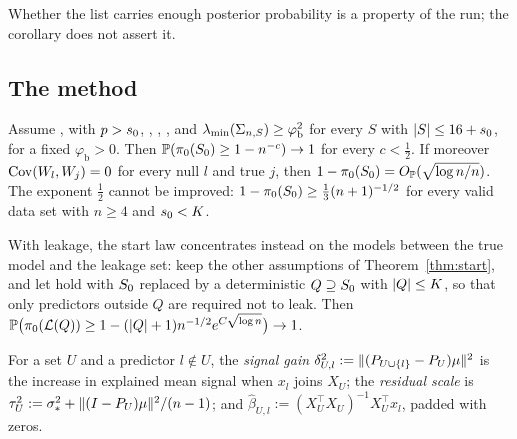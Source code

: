 Whether the list carries enough posterior probability is a property of the run; the corollary does not assert it.

\subsection{The method}\label{sec:supp-method}


\begin{theorem}\label{thm:start}
Assume ,  with $p>s_0$, , , , and $\lambda_{\min}(\Sigma_{n,S})\ge\varphi_{\mathrm b}^2$ for every
$S$ with $\lvert S\rvert\le16+s_0$, for a fixed $\varphi_{\mathrm b}>0$. Then $\mathbb{P}(\pi_0(S_0)\ge1-n^{-c})\to1$ for every
$c<\tfrac12$. If moreover $\operatorname{Cov}(W_l,W_j)=0$ for every null $l$ and true $j$, then $1-\pi_0(S_0)=O_{\mathbb{P}}(\sqrt{\log n/n})$. The exponent
$\tfrac12$ cannot be improved: $1-\pi_0(S_0)\ge\tfrac13(n+1)^{-1/2}$ for every valid data set with $n\ge4$ and $s_0<K$.
\end{theorem}


With leakage, the start law concentrates instead on the models between the true model and the leakage set: keep the
other assumptions of Theorem~\ref{thm:start}, and let  hold with $S_0$ replaced by a deterministic $Q\supseteq S_0$ with $\lvert Q\rvert\le K$, so
that only predictors outside $Q$ are required not to leak. Then $\mathbb{P}\big(\pi_0(\mathcal L(Q))\ge1-(\lvert Q\rvert+1)n^{-1/2}e^{C\sqrt{\log n}}\big)\to1$.


For a set $U$ and a predictor $l\notin U$, the \emph{signal gain} $\delta^2_{U,l}:=\lVert (P_{U\cup\{l\}}-P_U)\mu\rVert^2$ is the
increase in explained mean signal when $x_l$ joins $X_U$; the \emph{residual scale} is $\tau^2_U:=\sigma_*^2+\lVert (I-P_U)\mu\rVert^2/(n-1)$;
and $\hat\beta_{U,l}:=(X_U^\top X_U)^{-1}X_U^\top x_l$, padded with zeros.

